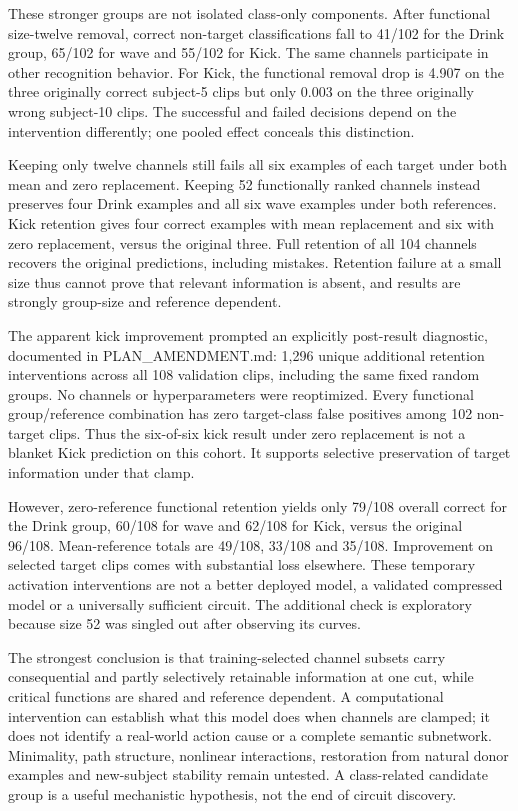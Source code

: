 \documentclass[11pt]{article}
\begin{document}
These stronger groups are not isolated class-only components. After functional size-twelve removal, correct non-target classifications fall to 41/102 for the Drink group, 65/102 for wave and 55/102 for Kick. The same channels participate in other recognition behavior. For Kick, the functional removal drop is 4.907 on the three originally correct subject-5 clips but only 0.003 on the three originally wrong subject-10 clips. The successful and failed decisions depend on the intervention differently; one pooled effect conceals this distinction.

Keeping only twelve channels still fails all six examples of each target under both mean and zero replacement. Keeping 52 functionally ranked channels instead preserves four Drink examples and all six wave examples under both references. Kick retention gives four correct examples with mean replacement and six with zero replacement, versus the original three. Full retention of all 104 channels recovers the original predictions, including mistakes. Retention failure at a small size thus cannot prove that relevant information is absent, and results are strongly group-size and reference dependent.

The apparent kick improvement prompted an explicitly post-result diagnostic, documented in PLAN\_AMENDMENT.md: 1,296 unique additional retention interventions across all 108 validation clips, including the same fixed random groups. No channels or hyperparameters were reoptimized. Every functional group/reference combination has zero target-class false positives among 102 non-target clips. Thus the six-of-six kick result under zero replacement is not a blanket Kick prediction on this cohort. It supports selective preservation of target information under that clamp.

However, zero-reference functional retention yields only 79/108 overall correct for the Drink group, 60/108 for wave and 62/108 for Kick, versus the original 96/108. Mean-reference totals are 49/108, 33/108 and 35/108. Improvement on selected target clips comes with substantial loss elsewhere. These temporary activation interventions are not a better deployed model, a validated compressed model or a universally sufficient circuit. The additional check is exploratory because size 52 was singled out after observing its curves.

The strongest conclusion is that training-selected channel subsets carry consequential and partly selectively retainable information at one cut, while critical functions are shared and reference dependent. A computational intervention can establish what this model does when channels are clamped; it does not identify a real-world action cause or a complete semantic subnetwork. Minimality, path structure, nonlinear interactions, restoration from natural donor examples and new-subject stability remain untested. A class-related candidate group is a useful mechanistic hypothesis, not the end of circuit discovery.
\end{document}
